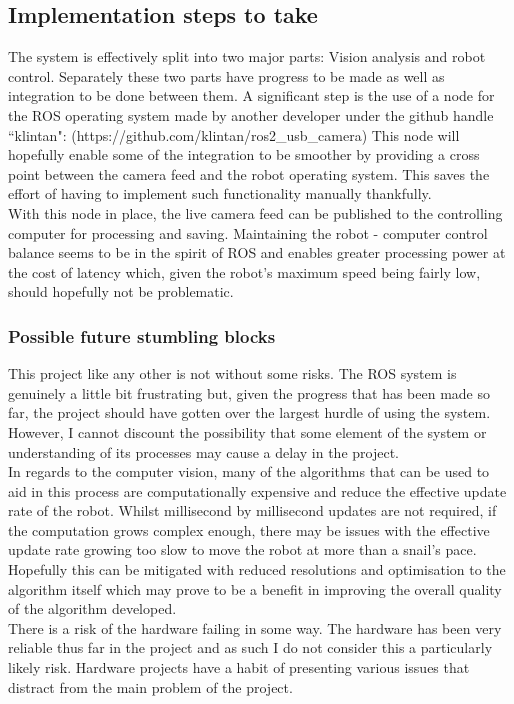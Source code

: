 \documentclass[10pt,a4paper]{report}
\begin{document}
	\subsection*{Implementation steps to take}
		The system is effectively split into two major parts: Vision analysis and robot control. Separately these two parts have progress to be made as well as integration to be done between them. A significant step is the use of a node for the ROS operating system made by another developer under the github handle ``klintan": (https://github.com/klintan/ros2\_usb\_camera) This node will hopefully enable some of the integration to be smoother by providing a cross point between the camera feed and the robot operating system. This saves the effort of having to implement such functionality manually thankfully. \\
		With this node in place, the live camera feed can be published to the controlling computer for processing and saving. Maintaining the robot - computer control balance seems to be in the spirit of ROS and enables greater processing power at the cost of latency which, given the robot’s maximum speed being fairly low, should hopefully not be problematic.
		\subsubsection*{Possible future stumbling blocks}
			This project like any other is not without some risks. The ROS system is genuinely a little bit frustrating but, given the progress that has been made so far, the project should have gotten over the largest hurdle of using the system. However, I cannot discount the possibility that some element of the system or understanding of its processes may cause a delay in the project. \\
			In regards to the computer vision, many of the algorithms that can be used to aid in this process are computationally expensive and reduce the effective update rate of the robot. Whilst millisecond by millisecond updates are not required, if the computation grows complex enough, there may be issues with the effective update rate growing too slow to move the robot at more than a snail's pace. Hopefully this can be mitigated with reduced resolutions and optimisation to the algorithm itself which may prove to be a benefit in improving the overall quality of the algorithm developed. \\
			There is a risk of the hardware failing in some way. The hardware has been very reliable thus far in the project and as such I do not consider this a particularly likely risk. Hardware projects have a habit of presenting various issues that distract from the main problem of the project. 
\end{document}
